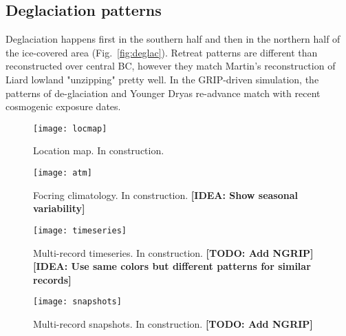 \documentclass[tc, ms]{copernicus}
\def\idea#1{\textcolor[rgb]{0,0.5,0}{\textbf{[IDEA: #1]}}}
\def\todo#1{\textcolor[rgb]{0.5,0,0}{\textbf{[TODO: #1]}}}
\begin{document}
\subsection{Deglaciation patterns}

Deglaciation happens first in the southern half and then in the northern half
of the ice-covered area (Fig.~\ref{fig:deglac}). Retreat patterns are different
than reconstructed over central BC, however they match Martin's reconstruction
of Liard lowland "unzipping" pretty well. In the GRIP-driven simulation, the
patterns of de-glaciation and Younger Dryas re-advance match with recent
cosmogenic exposure dates.

\conclusions
\label{sec:concl}


%


\begin{figure}
  \texttt{[image: locmap]}
  \caption{Location map. In construction.}
  \label{fig:locmap}
\end{figure}

\begin{figure}
  \texttt{[image: atm]}
  \caption{Focring climatology. In construction.
           \idea{Show seasonal variability}}
  \label{fig:atm}
\end{figure}

\begin{figure}
  \texttt{[image: timeseries]}
  \caption{Multi-record timeseries. In construction.
           \todo{Add NGRIP}
           \idea{Use same colors but different patterns for similar records}}
  \label{fig:timeseries}
\end{figure}

\begin{figure}
  \texttt{[image: snapshots]}
  \caption{Multi-record snapshots. In construction.
           \todo{Add NGRIP}}
  \label{fig:snapshots}
\end{figure}
\end{document}
